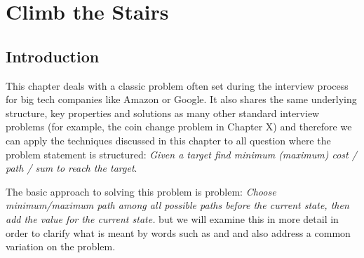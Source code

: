 %

\chapter{Climb the Stairs}
\label{ch:stairs_climbing}
\section*{Introduction}
This chapter deals with a classic problem often set during the interview process for big tech companies like Amazon or Google. It also shares the same underlying structure, key properties and solutions as many other standard interview problems (for example, the coin change problem in Chapter X) and therefore we can apply the techniques discussed in this chapter to all question where the problem statement is structured: \textit{Given a target find minimum (maximum) cost / path / sum to reach the target}.  

The basic approach to solving this problem is problem: \textit{Choose minimum/maximum path among all possible paths before the current state, then add the value for the current state.} but we will examine this in more detail in order to clarify what is meant by words such as  and  and also address a common variation on the problem. 

